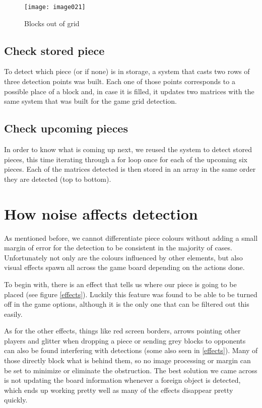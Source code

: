 \begin{figure}[h]
\centering
\texttt{[image: image021]}
\caption{\label{blocksout}Blocks out of grid}
\end{figure}

\subsection{Check stored piece}
To detect which piece (or if none) is in storage, a system that casts two rows of three detection points was built. Each one of those points corresponds to a possible place of a block and, in case it is filled, it updates two matrices with the same system that was built for the game grid detection.

\subsection{Check upcoming pieces}
In order to know what is coming up next, we reused the system to detect stored pieces, this time iterating through a for loop once for each of the upcoming six pieces. Each of the matrices detected is then stored in an array in the same order they are detected (top to bottom).

\section{How noise affects detection}
As mentioned before, we cannot differentiate piece colours without adding a small margin of error for the detection to be consistent in the majority of cases. Unfortunately not only are the colours influenced by other elements, but also visual effects spawn all across the game board depending on the actions done.

To begin with, there is an effect that tells us where our piece is going to be placed (see figure \ref{effects}). Luckily this feature was found to be able to be turned off in the game options, although it is the only one that can be filtered out this easily.

As for the other effects, things like red screen borders, arrows pointing other players and glitter when dropping a piece or sending grey blocks to opponents can also be found interfering with detections (some also seen in \ref{effects}). Many of those directly block what is behind them, so no image processing or margin can be set to minimize or eliminate the obstruction. The best solution we came across is not updating the board information whenever a foreign object is detected, which ends up working pretty well as many of the effects disappear pretty quickly.

